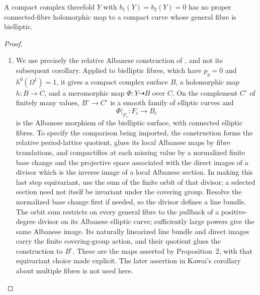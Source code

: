 \begin{proposition}\hypertarget{tag-01FD}{}\label{cdp:st:C.3.7}


A compact complex threefold $Y$ with $b_1(Y)=b_2(Y)=0$ has no
proper connected-fibre holomorphic map to a compact curve whose
general fibre is bielliptic.
\end{proposition}


\begin{proof}

\begin{enumerate}[label={$\langle1\rangle$\arabic*.},leftmargin=*]
\item We use precisely the relative Albanese construction of
\cite[Proposition~2, pp.~605--608]{Kawai1969}, and not its subsequent
corollary. Applied to bielliptic fibres, which have
$p_g=0$ and $h^0(\Omega^1)=1$, it gives a compact complex surface
$B$, a holomorphic map $h:B\to C$, and a meromorphic map
$\Phi:Y\dashrightarrow B$ over $C$. On the complement $C^\circ$
of finitely many values, $B^\circ\to C^\circ$ is a smooth family
of elliptic curves and
\[
 \Phi|_{F_c}:F_c\longrightarrow B_c
\]
is the Albanese morphism of the bielliptic surface, with connected
elliptic fibres. To specify the comparison being imported, the
construction forms the relative period-lattice quotient, glues its
local Albanese maps by fibre translations, and compactifies at each
missing value by a normalized finite base change and the projective
space associated with the direct images of a divisor which is the
inverse image of a local Albanese section. In making this last
step equivariant, use the sum of the finite orbit of that divisor;
a selected section need not itself be invariant under the covering
group. Resolve the normalized base change first if needed, so the
divisor defines a line bundle. The orbit sum restricts on every
general fibre to the pullback of a positive-degree divisor on its
Albanese elliptic curve; sufficiently large powers give the same
Albanese image. Its naturally linearized line bundle and direct
images carry the finite covering-group action, and their quotient
glues the construction to $B^\circ$. These are the maps asserted by
Proposition~2, with that equivariant choice made explicit. The
later assertion in Kawai's corollary about multiple fibres is not
used here.


\end{enumerate}
\end{proof}
